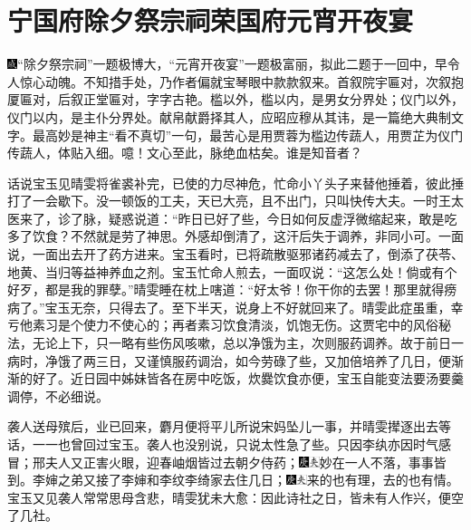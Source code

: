 

\chapter{宁国府除夕祭宗祠\hspace{.5em}荣国府元宵开夜宴}

{\includegraphics[width=3mm]{../Images/00005}``除夕祭宗祠''一题极博大，``元宵开夜宴''一题极富丽，拟此二题于一回中，早令人惊心动魄。不知措手处，乃作者偏就宝琴眼中款款叙来。首叙院宇匾对，次叙抱厦匾对，后叙正堂匾对，字字古艳。槛以外，槛以内，是男女分界处；仪门以外，仪门以内，是主仆分界处。献帛献爵择其人，应昭应穆从其讳，是一篇绝大典制文字。最高妙是神主``看不真切''一句，最苦心是用贾蓉为槛边传蔬人，用贾芷为仪门传蔬人，体贴入细。噫！文心至此，脉绝血枯矣。谁是知音者？}

话说宝玉见晴雯将雀裘补完，已使的力尽神危，忙命小丫头子来替他捶着，彼此捶打了一会歇下。没一顿饭的工夫，天已大亮，且不出门，只叫快传大夫。一时王太医来了，诊了脉，疑惑说道：``昨日已好了些，今日如何反虚浮微缩起来，敢是吃多了饮食？不然就是劳了神思。外感却倒清了，这汗后失于调养，非同小可。一面说，一面出去开了药方进来。宝玉看时，已将疏散驱邪诸药减去了，倒添了茯苓、地黄、当归等益神养血之剂。宝玉忙命人煎去，一面叹说：``这怎么处！倘或有个好歹，都是我的罪孽。''晴雯睡在枕上嗐道：``好太爷！你干你的去罢！那里就得痨病了。''宝玉无奈，只得去了。至下半天，说身上不好就回来了。晴雯此症虽重，幸亏他素习是个使力不使心的；再者素习饮食清淡，饥饱无伤。这贾宅中的风俗秘法，无论上下，只一略有些伤风咳嗽，总以净饿为主，次则服药调养。故于前日一病时，净饿了两三日，又谨慎服药调治，如今劳碌了些，又加倍培养了几日，便渐渐的好了。近日园中姊妹皆各在房中吃饭，炊爨饮食亦便，宝玉自能变法要汤要羹调停，不必细说。

袭人送母殡后，业已回来，麝月便将平儿所说宋妈坠儿一事，并晴雯撵逐出去等话，一一也曾回过宝玉。袭人也没别说，只说太性急了些。只因李纨亦因时气感冒；邢夫人又正害火眼，迎春岫烟皆过去朝夕侍药；{\includegraphics[width=3mm]{../Images/00004}\includegraphics[width=3mm]{../Images/00012}\footnotesize \kaishu 妙在一人不落，事事皆到。}李婶之弟又接了李婶和李纹李绮家去住几日；{\includegraphics[width=3mm]{../Images/00004}\includegraphics[width=3mm]{../Images/00012}\footnotesize \kaishu 来的也有理，去的也有情。}宝玉又见袭人常常思母含悲，晴雯犹未大愈：因此诗社之日，皆未有人作兴，便空了几社。

